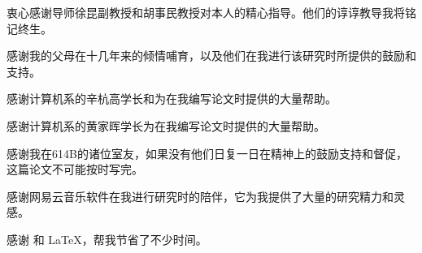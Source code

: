 \begin{acknowledgement}
  衷心感谢导师徐昆副教授和胡事民教授对本人的精心指导。他们的谆谆教导我将铭记终生。

  感谢我的父母在十几年来的倾情哺育，以及他们在我进行该研究时所提供的鼓励和支持。

  感谢计算机系的辛杭高学长和为在我编写论文时提供的大量帮助。

  感谢计算机系的黄家晖学长为在我编写论文时提供的大量帮助。
  
  感谢我在614B的诸位室友，如果没有他们日复一日在精神上的鼓励支持和督促，这篇论文不可能按时写完。

  感谢网易云音乐软件在我进行研究时的陪伴，它为我提供了大量的研究精力和灵感。

  感谢 \thuthesis\cite{thuthesis} 和 \LaTeX，帮我节省了不少时间。

\end{acknowledgement}
